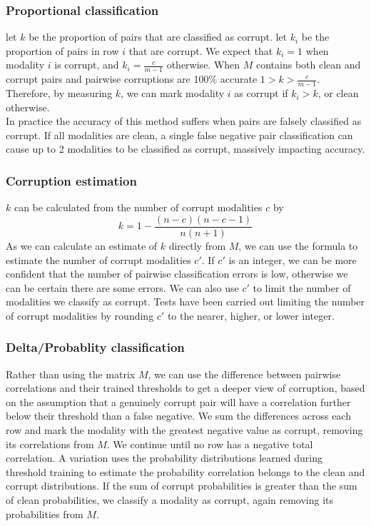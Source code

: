 \subsubsection{Proportional classification}
let $k$ be the proportion of pairs that are classified as corrupt. let $k_i$ be the proportion of pairs in row $i$ that are corrupt. We expect that $k_i = 1$ when modality $i$ is corrupt, and $k_i = \frac{c}{m-1}$ otherwise. When $M$ contains both clean and corrupt pairs and pairwise corruptions are 100\% accurate $1>k>\frac{c}{m-1}$. Therefore, by measuring $k$, we can mark modality $i$ as corrupt if $k_i > k$, or clean otherwise.\\
In practice the accuracy of this method suffers when pairs are falsely classified as corrupt. If all modalities are clean, a single false negative pair classification can cause up to 2 modalities to be classified as corrupt, massively impacting accuracy.

\subsubsection{Corruption estimation}
$k$ can be calculated from the number of corrupt modalities $c$ by 
$$
k = 1-\frac{(n-c)(n-c-1)}{n(n+1)}
$$
As we can calculate an estimate of $k$ directly from $M$, we can use the formula to estimate the number of corrupt modalities $c'$. If $c'$ is an integer, we can be more confident that the number of pairwise classification errors is low, otherwise we can be certain there are some errors. We can also use $c'$ to limit the number of modalities we classify as corrupt. Tests have been carried out limiting the number of corrupt modalities by rounding $c'$ to the nearer, higher, or lower integer.

\subsubsection{Delta/Probablity classification}
Rather than using the matrix $M$, we can use the difference between pairwise correlations and their trained thresholds to get a deeper view of corruption, based on the assumption that a genuinely corrupt pair will have a correlation further below their threshold than a false negative. We sum the differences across each row and mark the modality with the greatest negative value as corrupt, removing its correlations from $M$. We continue until no row has a negative total correlation. A variation uses the probability distributions learned during threshold training to estimate the probability correlation belongs to the clean and corrupt distributions. If the sum of corrupt probabilities is greater than the sum of clean probabilities, we classify a modality as corrupt, again removing its probabilities from $M$.

